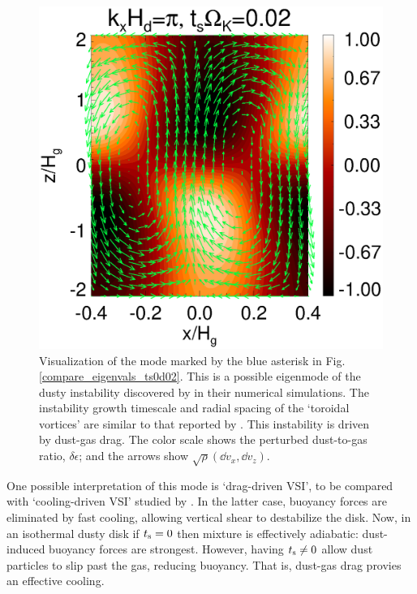 \begin{figure}
  \includegraphics[width=\linewidth]{figures/result2d_loren.ps}
  \caption{Visualization of the mode marked by the blue asterisk in
    Fig. \protect\ref{compare_eigenvals_ts0d02}. 
    This is a possible eigenmode of the dusty instability discovered by  
    \cite{loren15} in their numerical simulations. The instability growth timescale and 
    radial spacing of the `toroidal vortices' are similar to that 
    reported by \citeauthor{loren15}. This instability is driven by
    dust-gas drag. The color scale shows the 
    perturbed  
    dust-to-gas ratio, $\delta\epsilon$; and the arrows show
    $\sqrt{\rho}\left(\dd v_x, \dd v_z\right)$. 
  }\label{result2d_loren}
\end{figure}

One possible interpretation of this mode is `drag-driven VSI', to be 
compared with `cooling-driven VSI' studied by \cite{lin15}. In the
latter case, buoyancy forces are eliminated by fast
cooling, allowing vertical shear to destabilize the disk. Now, in an
isothermal dusty disk if $t_\mathrm{s}=0$ then mixture is 
effectively adiabatic: dust-induced buoyancy forces are
strongest. However, having $t_\mathrm{s}\neq0$ allow dust particles to slip
past the gas, reducing buoyancy. That is, dust-gas drag
provies an effective cooling. 


